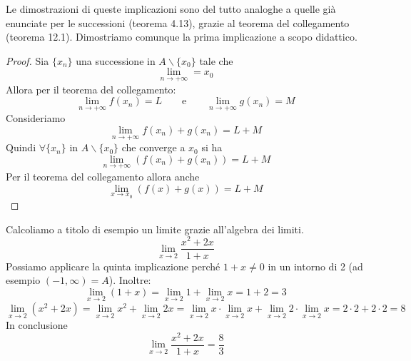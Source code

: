 Le dimostrazioni di queste implicazioni sono del tutto analoghe a quelle già enunciate per le successioni (teorema 4.13), grazie al teorema del collegamento (teorema 12.1). Dimostriamo comunque la prima implicazione a scopo didattico.

\begin{proof}
Sia $\{x_n\}$ una successione in $A\backslash\{x_0\}$ tale che
\begin{equation*}
\lim_{n \to +\infty} = x_0
\end{equation*}
Allora per il teorema del collegamento:
\begin{equation*}
\lim_{n \to +\infty} f(x_n) = L \qquad \text{e} \qquad \lim_{n \to +\infty} g(x_n) = M
\end{equation*}
Consideriamo
\begin{equation*}
\lim_{n \to +\infty} f(x_n) + g(x_n) = L + M
\end{equation*}
Quindi $\forall \{x_n\}$ in $A\backslash\{x_0\}$ che converge a $x_0$ si ha
\begin{equation*}
\lim_{n \to +\infty} (f(x_n) + g(x_n)) = L + M
\end{equation*}
Per il teorema del collegamento allora anche
\begin{equation*}
\lim_{x \to x_0} (f(x) + g(x)) = L + M
\end{equation*}
\end{proof}

\begin{example}
Calcoliamo a titolo di esempio un limite grazie all'algebra dei limiti.
\begin{equation*}
\lim_{x \to 2} \frac{x^2+2x}{1+x}
\end{equation*}
Possiamo applicare la quinta implicazione perché $1 + x \neq 0$ in un intorno di 2 (ad esempio $(-1, \infty) = A$). Inoltre:
\begin{equation*}
\lim_{x \to 2} (1+x) = \lim_{x \to 2} 1 + \lim_{x \to 2} x = 1 + 2 = 3
\end{equation*}
\begin{equation*}
\lim_{x \to 2} (x^2+2x) = \lim_{x \to 2} x^2 + \lim_{x \to 2} 2x = \lim_{x \to 2} x \cdot \lim_{x \to 2} x + \lim_{x \to 2} 2 \cdot \lim_{x \to 2} x = 2 \cdot 2 + 2 \cdot 2 = 8
\end{equation*}
In conclusione
\begin{equation*}
\lim_{x \to 2} \frac{x^2+2x}{1+x} = \frac{8}{3}
\end{equation*}
\end{example}